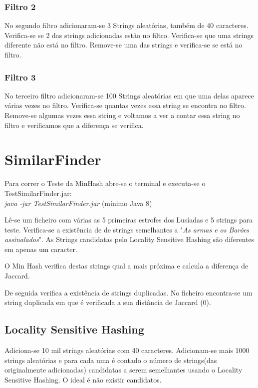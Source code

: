 \documentclass{report}
\begin{document}
\subsubsection{Filtro 2}
No segundo filtro adicionaram-se 3 Strings aleatórias, também de 40 caracteres.
Verifica-se se 2 das strings adicionadas estão no filtro.
Verifica-se que uma strings diferente não está no filtro.
Remove-se uma das strings e verifica-se se está no filtro.

\subsubsection{Filtro 3}

No terceiro filtro adicionaram-se 100 Strings aleatórias em que uma delas aparece várias vezes no filtro.
Verifica-se quantas vezes essa string se encontra no filtro.
Remove-se algumas vezes essa string e voltamos a ver a contar essa string no filtro e verificamos que a diferença se verifica.

\section{SimilarFinder}
Para correr o Teste da MinHash abre-se o terminal e executa-se o TestSimilarFinder.jar:
\\
\textit{ java -jar TestSimilarFinder.jar} (mínimo Java 8)


Lê-se um ficheiro com várias as 5 primeiras estrofes dos Lusíadas e 5 strings para teste.
Verifica-se a existência de de strings semelhantes a "\textit{As armas e os Barões assinalados}".
As Strings candidatas pelo Locality Sensitive Hashing são diferentes em apenas um caracter.

O Min Hash verifica destas strings qual a mais próxima e calcula a diferença de Jaccard.

De seguida verifica a existência de strings duplicadas. No ficheiro encontra-se um string duplicada em que é verificada a sua distância de Jaccard (0).

\subsection{Locality Sensitive Hashing} 
Adiciona-se 10 mil strings aleatórias com 40 caracteres.
Adicionam-se mais 1000 strings aleatórias e para cada uma é contado o número de strings(das originalmente adicionadas) candidatas a serem semelhantes usando o Locality Sensitive Hashing. O ideal é não existir candidatos.
\end{document}
